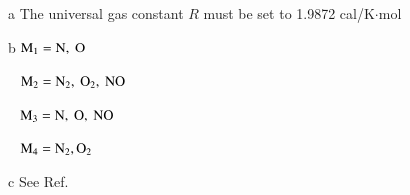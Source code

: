 \documentclass{warpdoc}
\begin{document}
\begin{table}[t]
\begin{center}
\begin{threeparttable}
\begin{tabular}{cccccccc}
\bottomrule
\end{tabular}
\begin{tablenotes}
\item[{a}] The universal gas constant $R$ must be set to 1.9872	cal/K$\cdot$mol 
\item[{b}] $\rm M_1=N,~O$
\item[~] $\rm M_2=N_2,~O_2,~NO$
\item[~] $\rm M_3= N,~O,~NO$
\item[~] $\rm M_4=N_2,O_2$
\item[{c}] See Ref.\ \cite{jtht:1991:candler}
\end{tablenotes}
\label{tab:parkcandlerboyd}
\end{threeparttable}
\end{center}
\end{table}
%
\end{document}
